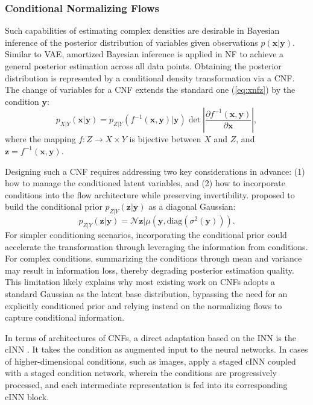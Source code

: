 \subsubsection{Conditional Normalizing Flows}
\label{sec:condnf}
Such capabilities of estimating complex densities are desirable in Bayesian inference of the posterior distribution of variables given observations $p(\boldsymbol{x}|\boldsymbol{y})$. Similar to \ac{VAE}, amortized Bayesian inference \citep{radev2021diss} is applied in \ac{NF} to achieve a general posterior estimation across all data points. Obtaining the posterior distribution is represented by a conditional density transformation via a \ac{CNF}. The change of variables for a \ac{CNF} extends the standard one (\ref{eq:xnfz}) by the condition $\boldsymbol{y}$:
\begin{equation}
    p_{X|Y}(\boldsymbol{x}|\boldsymbol{y}) = p_{Z|Y}(f^{-1}(\boldsymbol{x},\boldsymbol{y})|\boldsymbol{y})\det\left|\frac{\partial f^{-1}(\boldsymbol{x},\boldsymbol{y})}{\partial\boldsymbol{x}}\right|,
\end{equation}
where the mapping $f:Z\rightarrow X\times Y$ is bijective between $X$ and $Z$, and $\boldsymbol{z}=f^{-1}(\boldsymbol{x},\boldsymbol{y})$.

Designing such a \ac{CNF} requires addressing two key considerations in advance: (1) how to manage the conditioned latent variables, and (2) how to incorporate conditions into the flow architecture while preserving invertibility. \citeauthor{winkler2023cnf} \citeyearpar{winkler2023cnf} proposed to build the conditional prior $p_{Z|Y}(\boldsymbol{z}|\boldsymbol{y})$ as a diagonal Gaussian:
\begin{equation}
    p_{Z|Y}(\boldsymbol{z}|\boldsymbol{y}) = \mathcal{N}{\boldsymbol{z}|\mu(\boldsymbol{y}, \text{diag}(\sigma^2(\boldsymbol{y})))}.
\end{equation}
For simpler conditioning scenarios, incorporating the conditional prior could accelerate the transformation through leveraging the information from conditions. For complex conditions, summarizing the conditions through mean and variance may result in information loss, thereby degrading posterior estimation quality. This limitation likely explains why most existing work on \acp{CNF} adopts a standard Gaussian as the latent base distribution, bypassing the need for an explicitly conditioned prior and relying instead on the normalizing flows to capture conditional information.

In terms of architectures of \acp{CNF}, a direct adaptation based on the \ac{INN} is the \ac{cINN} \citep{ardizzone2019cinn}. It takes the condition as augmented input to the neural networks. In cases of higher-dimensional conditions, such as images, \citeauthor{govinda2021cinn} \citeyearpar{govinda2021cinn} apply a staged \ac{cINN} coupled with a staged condition network, wherein the conditions are progressively processed, and each intermediate representation is fed into its corresponding \ac{cINN} block.

